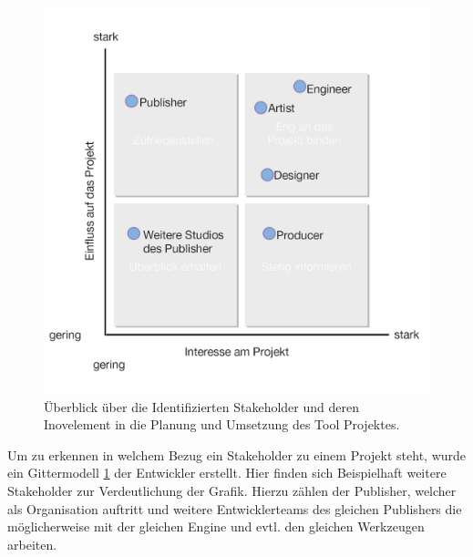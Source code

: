 \documentclass[pagesize, paper=a4, fontsize=12pt, titlepage=true, headings=small, headnosepline, abstractoff, liststotoc, nochapterprefix, plainheadsepline, twoside]{scrreprt}
\begin{document}
\begin{figure}[hb]
	\centering
	\includegraphics[width=\linewidth]{Bilder/Stakeholder_Diagramm.jpg}
	\caption{Überblick über die Identifizierten Stakeholder und deren Inovelement in die Planung und Umsetzung des Tool Projektes.}
	\label{StakeholderGrafik}
\end{figure}

Um zu erkennen in welchem Bezug ein Stakeholder zu einem Projekt steht, wurde ein Gittermodell \ref{StakeholderGrafik} der Entwickler erstellt. Hier finden sich Beispielhaft weitere Stakeholder zur Verdeutlichung der Grafik. Hierzu zählen der Publisher, welcher als Organisation auftritt und weitere Entwicklerteams des gleichen Publishers die möglicherweise mit der gleichen Engine und evtl. den gleichen Werkzeugen arbeiten.
\end{document}
